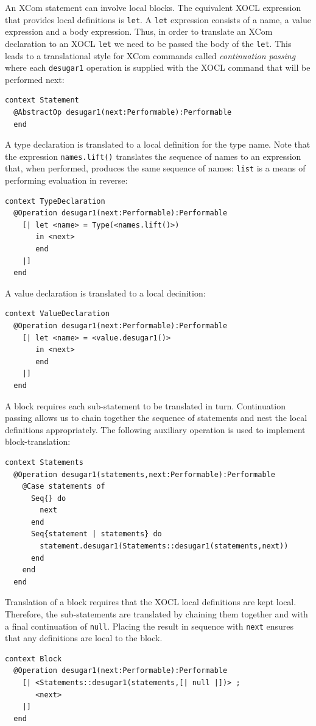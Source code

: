 \documentclass{article}
\begin{document}
An XCom statement can involve local blocks. The equivalent XOCL expression that provides local definitions
is {\tt let}. A {\tt let} expression consists of a name, a value expression and a body expression. Thus,
in order to translate an XCom declaration to an XOCL {\tt let} we need to be passed the body of the {\tt let}.
This leads to a translational style for XCom commands called {\em continuation passing} where
each {\tt desugar1} operation is supplied with the XOCL command that will be performed next:
\begin{verbatim}
context Statement
  @AbstractOp desugar1(next:Performable):Performable
  end
\end{verbatim}
A type declaration is translated to a local definition for the type name. Note that the
expression {\tt names.lift()} translates the sequence of names to an expression that, when
performed, produces the same sequence of names: {\tt list} is a means of performing evaluation in
reverse:
\begin{verbatim}
context TypeDeclaration
  @Operation desugar1(next:Performable):Performable
    [| let <name> = Type(<names.lift()>) 
       in <next> 
       end 
    |]
  end
\end{verbatim}
A value declaration is translated to a local decinition:
\begin{verbatim}
context ValueDeclaration
  @Operation desugar1(next:Performable):Performable
    [| let <name> = <value.desugar1()> 
       in <next> 
       end
    |]
  end
\end{verbatim}
A block requires each sub-statement to be translated in turn. Continuation passing allows us
to chain together the sequence of statements and nest the local definitions appropriately.
The following auxiliary operation is used to implement block-translation:
\begin{verbatim}
context Statements
  @Operation desugar1(statements,next:Performable):Performable
    @Case statements of
      Seq{} do 
        next 
      end
      Seq{statement | statements} do 
        statement.desugar1(Statements::desugar1(statements,next)) 
      end
    end
  end
\end{verbatim}
Translation of a block requires that the XOCL local definitions are kept local. Therefore,
the sub-statements are translated by chaining them together and with a final continuation 
of {\tt null}. Placing the result in sequence with {\tt next} ensures that any definitions
are local to the block.
\begin{verbatim}
context Block
  @Operation desugar1(next:Performable):Performable
    [| <Statements::desugar1(statements,[| null |])> ; 
       <next> 
    |]
  end
\end{verbatim}
\end{document}
